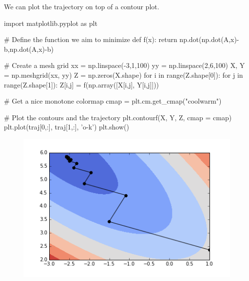 \documentclass{article}
\begin{document}
We can plot the trajectory on top of a contour plot.
 
\begin{ipythonnb}
import matplotlib.pyplot as plt

# Define the function we aim to minimize
def f(x):
    return np.dot(np.dot(A,x)-b,np.dot(A,x)-b)

# Create a mesh grid 
xx = np.linspace(-3,1,100)
yy = np.linspace(2,6,100)
X, Y = np.meshgrid(xx, yy)
Z = np.zeros(X.shape)
for i in range(Z.shape[0]):
    for j in range(Z.shape[1]):
        Z[i,j] = f(np.array([X[i,j], Y[i,j]]))

# Get a nice monotone colormap
cmap = plt.cm.get_cmap("coolwarm")

# Plot the contours and the trajectory
plt.contourf(X, Y, Z, cmap = cmap)
plt.plot(traj[0,:], traj[1,:], 'o-k')
plt.show()
\end{ipythonnb}

\begin{figure}[h!]
\centering
\includegraphics[width=1\textwidth]{images/contourtraj.png}
\end{figure}
\end{document}
